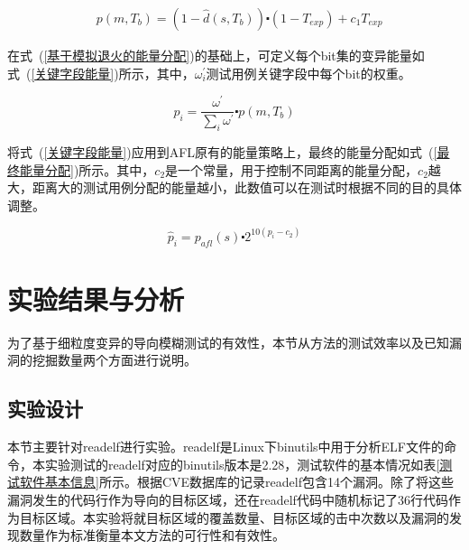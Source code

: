 \begin{equation}\label{基于模拟退火的能量分配}
\begin{aligned}
& p(m,T_{b}) = (1- \hat{d}(s,T_{b})) \centerdot (1-T_{exp}) + c_{1}T_{exp}
\end{aligned}
\end{equation}

在式~(\ref{基于模拟退火的能量分配})的基础上，可定义每个bit集的变异能量如式~(\ref{关键字段能量})所示，其中，$\omega^{'}_{i}$测试用例关键字段中每个bit的权重。

\begin{equation}\label{关键字段能量}
p_{i} = \frac{\omega^{'}}{\sum_{i} \omega^{'}} \centerdot p(m,T_{b})
\end{equation}

将式~(\ref{关键字段能量})应用到AFL原有的能量策略上，最终的能量分配如式~(\ref{最终能量分配})所示。其中，$c_{2}$是一个常量，用于控制不同距离的能量分配，$c_{2}$越大，距离大的测试用例分配的能量越小，此数值可以在测试时根据不同的目的具体调整。

\begin{equation}\label{最终能量分配}
\hat{p}_{i} = p_{afl}(s) \centerdot 2^{10(p_{i}-c_{2})}
\end{equation}

\section{实验结果与分析}

为了基于细粒度变异的导向模糊测试的有效性，本节从方法的测试效率以及已知漏洞的挖掘数量两个方面进行说明。
\subsection{实验设计}


本节主要针对readelf进行实验。readelf是Linux下binutils中用于分析ELF文件的命令，本实验测试的readelf对应的binutils版本是2.28，测试软件的基本情况如表\ref{测试软件基本信息}所示。根据CVE数据库的记录readelf包含14个漏洞。除了将这些漏洞发生的代码行作为导向的目标区域，还在readelf代码中随机标记了36行代码作为目标区域。本实验将就目标区域的覆盖数量、目标区域的击中次数以及漏洞的发现数量作为标准衡量本文方法的可行性和有效性。

